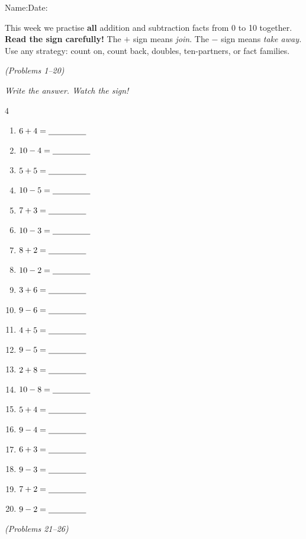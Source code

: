 \documentclass[12pt, letterpaper]{article}
\begin{document}

{\small Name:\ansblanklg \hfill Date:\ansblank}
\goldrule

\begin{instructbox}
This week we practise \textbf{all} addition and subtraction facts from 0 to 10 together.\\[4pt]
\textbf{Read the sign carefully!} The $+$ sign means \emph{join}. The $-$ sign means \emph{take away.}\\
Use any strategy: count on, count back, doubles, ten-partners, or fact families.
\end{instructbox}

\bigskip
{} \hfill \textit{(Problems 1–20)}

\medskip\noindent\textit{Write the answer. Watch the sign!}

\bigskip
\begin{multicols}{4}
\begin{enumerate}[leftmargin=*,label=\textbf{\arabic*.},itemsep=9pt]
  \item $6+4=\underline{\hspace{1.6cm}}$
  \item $10-4=\underline{\hspace{1.6cm}}$
  \item $5+5=\underline{\hspace{1.6cm}}$
  \item $10-5=\underline{\hspace{1.6cm}}$
  \item $7+3=\underline{\hspace{1.6cm}}$
  \item $10-3=\underline{\hspace{1.6cm}}$
  \item $8+2=\underline{\hspace{1.6cm}}$
  \item $10-2=\underline{\hspace{1.6cm}}$
  \item $3+6=\underline{\hspace{1.6cm}}$
  \item $9-6=\underline{\hspace{1.6cm}}$
  \item $4+5=\underline{\hspace{1.6cm}}$
  \item $9-5=\underline{\hspace{1.6cm}}$
  \item $2+8=\underline{\hspace{1.6cm}}$
  \item $10-8=\underline{\hspace{1.6cm}}$
  \item $5+4=\underline{\hspace{1.6cm}}$
  \item $9-4=\underline{\hspace{1.6cm}}$
  \item $6+3=\underline{\hspace{1.6cm}}$
  \item $9-3=\underline{\hspace{1.6cm}}$
  \item $7+2=\underline{\hspace{1.6cm}}$
  \item $9-2=\underline{\hspace{1.6cm}}$
\end{enumerate}
\end{multicols}

\bigskip\bigskip
{} \hfill \textit{(Problems 21–26)}
\end{document}
